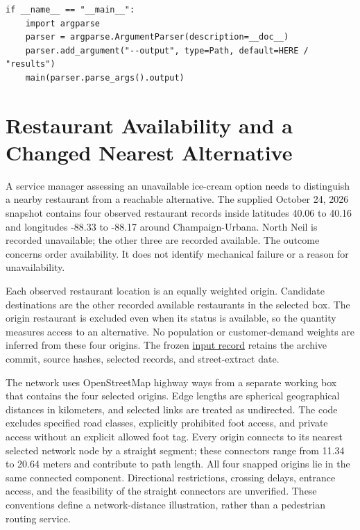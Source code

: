 \begin{Verbatim}[breaklines,breakanywhere,fontsize=\small]
if __name__ == "__main__":
    import argparse
    parser = argparse.ArgumentParser(description=__doc__)
    parser.add_argument("--output", type=Path, default=HERE / "results")
    main(parser.parse_args().output)
\end{Verbatim}

\hypertarget{M05-restaurant-availability-and-a-changed-nearest-alternative}{%
\section{Restaurant Availability and a Changed Nearest
Alternative}\label{M05-restaurant-availability-and-a-changed-nearest-alternative}}

\noindent \noindent A service manager assessing an unavailable ice-cream option
needs to distinguish a nearby restaurant from a reachable alternative.
The supplied October 24, 2026 snapshot contains four observed restaurant
records inside latitudes 40.06 to 40.16 and longitudes -88.33 to -88.17
around Champaign-Urbana. North Neil is recorded unavailable; the other
three are recorded available. The outcome concerns order availability.
It does not identify mechanical failure or a reason for unavailability.

Each observed restaurant location is an equally weighted origin.
Candidate destinations are the other recorded available restaurants in
the selected box. The origin restaurant is excluded even when its status
is available, so the quantity measures access to an alternative. No
population or customer-demand weights are inferred from these four
origins. The frozen
\href{../03_Data_and_Code/Retail_Accessibility/data/manifest.json}{input
record} retains the archive commit, source hashes, selected records, and
street-extract date.

The network uses OpenStreetMap highway ways from a separate working box
that contains the four selected origins. Edge lengths are spherical
geographical distances in kilometers, and selected links are treated as
undirected. The code excludes specified road classes, explicitly
prohibited foot access, and private access without an explicit allowed
foot tag. Every origin connects to its nearest selected network node by
a straight segment; these connectors range from 11.34 to 20.64 meters
and contribute to path length. All four snapped origins lie in the same
connected component. Directional restrictions, crossing delays, entrance
access, and the feasibility of the straight connectors are unverified.
These conventions define a network-distance illustration, rather than a
pedestrian routing service.

